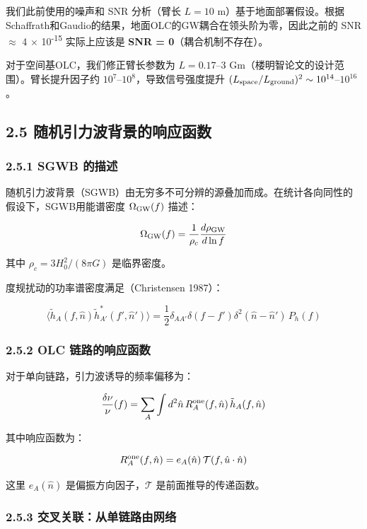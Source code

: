 \documentclass[12pt,a4paper]{article}
\begin{document}
我们此前使用的噪声和 SNR 分析（臂长 $L = 10$ m）基于地面部署假设。根据Schaffrath和Gaudio的结果，地面OLC的GW耦合在领头阶为零，因此之前的 SNR $\approx$ 4 $\times$ 10\textsuperscript{-15} 实际上应该是 \textbf{SNR = 0}（耦合机制不存在）。

对于空间基OLC，我们修正臂长参数为 $L = 0.17$–3 Gm（楼明智论文的设计范围）。臂长提升因子约 $10^7$–$10^8$，导致信号强度提升 $(L_{\rm space}/L_{\rm ground})^2 \sim 10^{14}$–$10^{16}$。

\subsection{2.5 随机引力波背景的响应函数}


\subsubsection{2.5.1 SGWB 的描述}


随机引力波背景（SGWB）由无穷多不可分辨的源叠加而成。在统计各向同性的假设下，SGWB用能谱密度 $\Omega_{\rm GW}(f)$ 描述：

$$\Omega_{\rm GW}(f) = \frac{1}{\rho_c}\frac{d\rho_{\rm GW}}{d\ln f}$$

其中 $\rho_c = 3H_0^2/(8\pi G)$ 是临界密度。

度规扰动的功率谱密度满足（Christensen 1987）：

$$\langle \tilde{h}_A(f, \hat{n}) \tilde{h}_{A'}^*(f', \hat{n}')\rangle = \frac{1}{2}\delta_{AA'}\delta(f-f')\delta^2(\hat{n}-\hat{n}')\, P_h(f)$$

\subsubsection{2.5.2 OLC 链路的响应函数}


对于单向链路，引力波诱导的频率偏移为：

$$\frac{\delta\nu}{\nu}(f) = \sum_A \int d^2\hat{n}\, R_A^{\rm one}(f, \hat{n})\, \tilde{h}_A(f, \hat{n})$$

其中响应函数为：

$$R_A^{\rm one}(f, \hat{n}) = e_A(\hat{n})\, \mathcal{T}(f, \hat{u}\cdot\hat{n})$$

这里 $e_A(\hat{n})$ 是偏振方向因子，$\mathcal{T}$ 是前面推导的传递函数。

\subsubsection{2.5.3 交叉关联：从单链路由网络}
\end{document}
